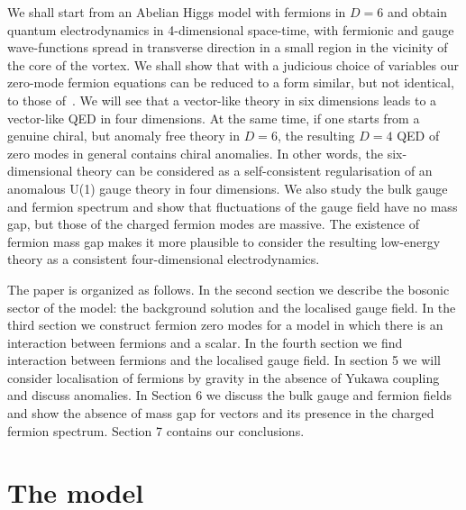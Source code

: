 \documentclass[a4paper,12pt]{article}
\begin{document}
We shall start from an Abelian Higgs model with fermions in $D=6$ and
obtain quantum electrodynamics in 4-dimensional space-time, with
fermionic and gauge wave-functions spread in transverse direction in
a small region in the vicinity of the core of the vortex.  We shall
show that with a judicious choice of variables our zero-mode fermion
equations can be reduced to a form similar, but not identical, to
those of~\cite{Jackiw:1981ee}. We will see that a vector-like theory
in six dimensions leads to a vector-like QED in four dimensions. At
the same time, if one starts from a genuine chiral, but anomaly free
theory in $D=6$, the resulting $D=4$ QED of zero modes in general
contains chiral anomalies. In other words, the six-dimensional theory
can be considered as a self-consistent regularisation of an anomalous
U(1) gauge theory in four dimensions. We also study  the bulk gauge
and fermion spectrum and show that fluctuations of the gauge field
have no mass gap, but those of the charged fermion modes are
massive. The existence of fermion mass gap makes it more plausible to
consider the resulting low-energy theory as a consistent
four-dimensional electrodynamics. 

The paper is organized as follows. In the second section we describe
the bosonic sector of the model: the background solution and the
localised gauge field. In the third section we construct fermion zero
modes for a model in which there is an interaction between fermions
and a scalar. In the fourth section we find interaction between
fermions and the localised gauge field. In section 5 we will consider
localisation of fermions by gravity in the absence of Yukawa coupling
and discuss anomalies. In Section 6 we discuss the bulk gauge and
fermion fields and show the absence of mass gap for vectors and its
presence in the charged fermion spectrum. Section 7 contains our 
conclusions.

\section{The model}
\end{document}
